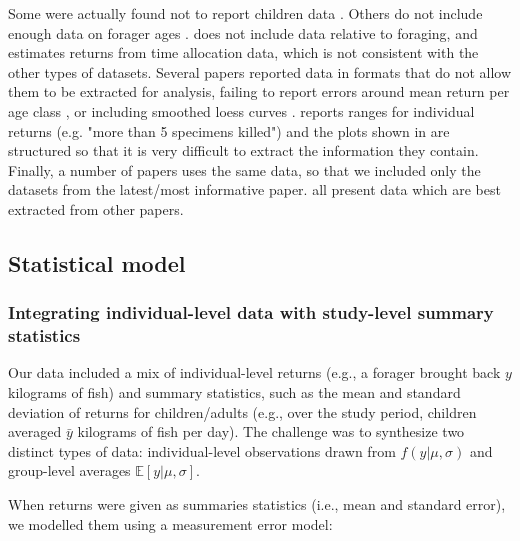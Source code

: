 Some were actually found not to report children data \citep{blurton_jones_foraging_1994, kraft_foraging_2019}. 
Others do not include enough data on forager ages \citep{bird_children_2002, hagino_high_2016, hooper_skills_2015, kramer_early_2009}.   
\cite{kramer_production_2005} does not include data relative to foraging, and \cite{kramer_does_2009} estimates returns from time allocation data, which is not consistent with the other types of datasets.  
Several papers reported data in formats that do not allow them to be extracted for analysis, failing to report errors around mean return per age class \citep{kaplan_evolution_1997, kaplan_theory_2000, kaplan_emergence_2002}, or including smoothed loess curves \citep{kaplan_evolutionary_1994, kaplan_theory_1996, kaplan_embodied_2003, marlowe_foraging_2010}. 
\cite{kawabe_development_1983} reports ranges for individual returns (e.g. "more than 5 specimens killed") and the plots shown in \cite{koster_hunting_2007} are structured so that it is very difficult to extract the information they contain.
Finally, a number of papers uses the same data, so that we included only the datasets from the latest/most informative paper. \cite{bird_ethnoarchaeology_2000, blurton_jones_lives_1993, crittenden_allomaternal_2009, kramer_evolution_2011, mcelreath_using_2014, pollom_changes_2020, walker_evolution_2004} all present data which are best extracted from other papers.


\subsection{Statistical model}\label{SI:model}

\subsubsection{Integrating individual-level data with study-level summary statistics}

Our data included a mix of individual-level returns (e.g., a forager brought back $y$ kilograms of fish) and summary statistics, such as the mean and standard deviation of returns for children/adults (e.g., over the study period, children averaged $\bar{y}$ kilograms of fish per day). The challenge was to synthesize two distinct types of data: individual-level observations drawn from $f(y|\mu,\sigma)$ and group-level averages $\mathbb{E}[y|\mu,\sigma]$.

When returns were given as summaries statistics (i.e., mean and standard error), we modelled them using a measurement error model:

